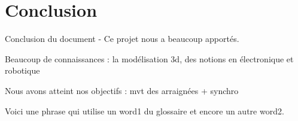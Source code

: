 	\chapter{Conclusion}

Conclusion du document - Ce projet nous a beaucoup apportés.

Beaucoup de connaissances : la modélisation 3d, des notions en électronique et robotique

Nous avons atteint nos objectifs : mvt des arraignées + synchro


Voici une phrase qui utilise un \gls{word1} du glossaire et encore un autre \gls{word2}.